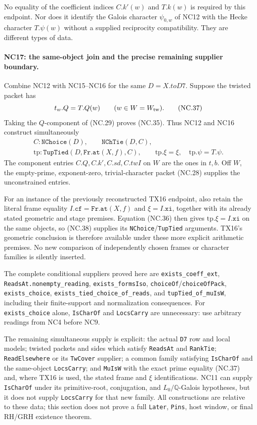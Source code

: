 No equality of the coefficient indices \(C.k'(w)\) and
\(T.k(w)\) is required by this endpoint. Nor does it identify
the Galois character \(\psi_{0,w}\) of NC12 with the Hecke
character \(T.\psi(w)\) without a supplied reciprocity
compatibility. They are different types of data.

\paragraph{NC17: the same-object join and the precise remaining supplier boundary.}
Combine NC12 with NC15--NC16 for the same \(D=X.toD7\).
Suppose the twisted packet has
\[
 t_w.Q=T.Q(w)\qquad(w\in W=W_{\rm tw}).
 \tag{NC.37}
\]
Taking the \(Q\)-component of (NC.29) proves (NC.35).
Thus NC12 and NC16 construct simultaneously
\[
 \begin{gathered}
 C:\texttt{NChoice}(D),\qquad \texttt{NChTie}(D,C),\\
 \mathrm{tp}:\texttt{TupTied}(D,\texttt{Fr.at}(X,f),C),
 \qquad \mathrm{tp}.\xi=\xi,\quad \mathrm{tp}.\psi=T.\psi.
 \end{gathered}
 \tag{NC.38}
\]
The component entries \(C.Q,C.k',C.sd,C.twI\) on \(W\)
are the ones in \(t,b\). Off \(W\), the empty-prime,
exponent-zero, trivial-character packet (NC.28) supplies
the unconstrained entries.

For an instance of the previously reconstructed TX16 endpoint,
also retain the literal frame equality
\(I.\texttt{cf}=\texttt{Fr.at}(X,f)\) and
\(\xi=I.\texttt{xi}\), together with its already stated
geometric and stage premises. Equation (NC.36) then gives
\(\mathrm{tp}.\xi=I.\texttt{xi}\) on the same objects,
so (NC.38) supplies its \texttt{NChoice}/\texttt{TupTied}
arguments. TX16's geometric conclusion is therefore
available under these more explicit arithmetic premises.
No new comparison of independently chosen frames or
character families is silently inserted.

The complete conditional suppliers proved here are
\texttt{exists\_coeff\_ext},
\texttt{ReadsAt.nonempty\_reading},
\texttt{exists\_formsIso},
\texttt{choiceOf}/\texttt{choiceOfPack},
\texttt{exists\_choice},
\texttt{exists\_tied\_choice\_of\_reads}, and
\texttt{tupTied\_of\_muIsW}, including their finite-support
and normalization consequences. For \texttt{exists\_choice}
alone, \texttt{IsCharOf} and \texttt{LocsCarry} are unnecessary:
use arbitrary readings from NC4 before NC9.

The remaining simultaneous supply is explicit:
the actual \texttt{D7} row and local models;
twisted packets and sides which satisfy \texttt{ReadsAt}
and \texttt{RankTie}; \texttt{ReadElsewhere} or its
\texttt{TwCover} supplier; a common family satisfying
\texttt{IsCharOf} and the same-object \texttt{LocsCarry};
and \texttt{MuIsW} with the exact prime equality (NC.37)
and, where TX16 is used, the stated frame and \(\xi\)
identifications.
NC11 can supply \texttt{IsCharOf} under its primitive-root,
conjugation, and \(L_0/\mathbb Q\)-Galois hypotheses,
but it does not supply \texttt{LocsCarry} for that new family.
All constructions are relative to these data; this section
does not prove a full \texttt{Later}, \texttt{Pins}, host
window, or final RH/GRH existence theorem.
